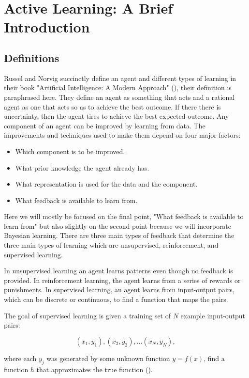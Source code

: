 \chapter{Active Learning: A Brief Introduction}



\section{Definitions}
Russel and Norvig succinctly define an agent and different types of learning in their book "Artificial Intelligence: A Modern Approach" (\cite{russell2009artificial}), their definition is paraphrased here. They define an agent as something that acts and a rational agent as one that acts so as to achieve the best outcome. If there there is uncertainty, then the agent tires to achieve the best expected outcome. Any component of an agent can be improved by learning from data. The improvements and techniques used to make them depend on four major factors:

\begin{itemize}
  \item Which component is to be improved.
  \item What prior knowledge the agent already has.
  \item What representation is used for the data and the component.
  \item What feedback is available to learn from.  
\end{itemize}

Here we will mostly be focused on the final point, "What feedback is available to learn from" but also slightly on the second point because we will incorporate Bayesian learning. There are three main types of feedback that determine the three main types of learning which are unsupervised, reinforcement, and supervised learning. 

In unsupervised learning an agent learns patterns even though no feedback is provided. In reinforcement learning, the agent learns from a series of rewards or punishments. In supervised learning, an agent learns from input-output pairs, which can be discrete or continuous, to find a function that maps the pairs. 

The goal of supervised learning is given a training set of $N$ example input-output pairs:

\[(x_1, y_1), (x_2,y_2),... (x_N,y_N),\]

where each $y_j$ was generated by some unknown function $y=f(x)$, find a function $h$ that approximates the true function
(\cite{russell2009artificial}).

